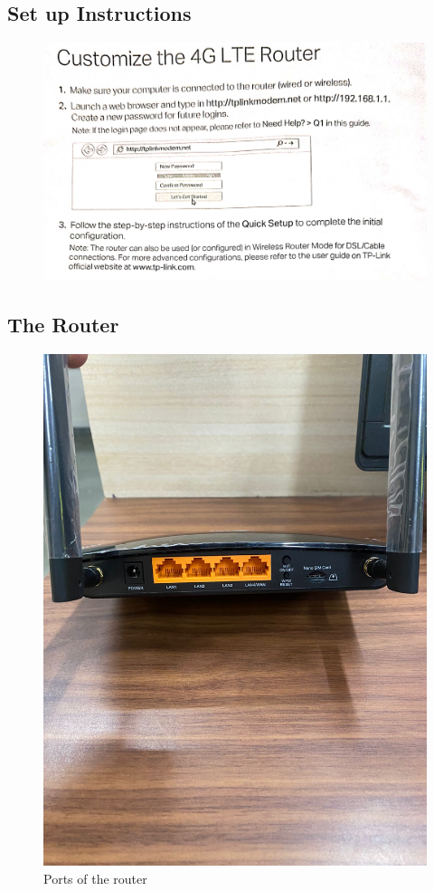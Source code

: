 \documentclass[11pt]{article}
\begin{document}
\subsection{Set up Instructions}

\begin{figure}[H]
    \centering
    \includegraphics[width=.85\textwidth]{lab router/connection.png}
\end{figure}

\subsection{The Router}

\begin{figure}[H]
    \centering
    \includegraphics[width=.85\textwidth]{lab router/router 3.jpeg}
    \caption{Ports of the router}
\end{figure}
\end{document}
